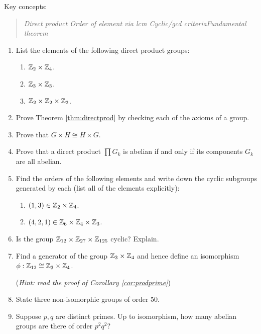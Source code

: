 \begin{tcolorbox}[exercisestyle,title={Exercises \thesection.\phantom{b}}]
Key concepts:
\begin{quote}
	\emph{Direct product \qquad Order of element via lcm \qquad Cyclic/gcd criteria\qquad Fundamental theorem}
\end{quote}

\begin{enumerate}
	\item List the elements of the following direct product groups:
	\begin{enumerate}
  	\item $\mathbb{Z}_2\times\mathbb{Z}_4$.
  	\item $\mathbb{Z}_3\times\mathbb{Z}_3$.
  	\item $\mathbb{Z}_2\times\mathbb{Z}_2\times\mathbb{Z}_2$.
	\end{enumerate}
	
  \item Prove Theorem \ref{thm:directprod} by checking each of the axioms of a group.

	\item Prove that $G\times H\cong H\times G$.
	
	\item Prove that a direct product $\prod G_k$ is abelian if and only if its components $G_k$ are all abelian.
	
	\item Find the orders of the following elements and write down the cyclic subgroups generated by each (list all of the elements explicitly):
	\begin{enumerate}
  	\item $(1,3)\in\mathbb{Z}_2\times\mathbb{Z}_4$.
  	\item $(4,2,1)\in\mathbb{Z}_6\times\mathbb{Z}_4\times\mathbb{Z}_3$.
	\end{enumerate}
	
	\item Is the group $\mathbb{Z}_{12}\times \mathbb{Z}_{27}\times\mathbb{Z}_{125}$ cyclic? Explain.

	\item Find a generator of the group $\mathbb{Z}_3\times\mathbb{Z}_4$ and hence define an isomorphism $\phi:\mathbb{Z}_{12}\cong\mathbb{Z}_3\times\mathbb{Z}_4$.\par
	(\emph{Hint: read the proof of Corollary \ref{cor:prodprime}})


	\item State three non-isomorphic groups of order 50.
	
	\item Suppose $p,q$ are distinct primes. Up to isomorphism, how many abelian groups are there of order $p^2q^2$?
	

\end{enumerate}
\end{tcolorbox}

